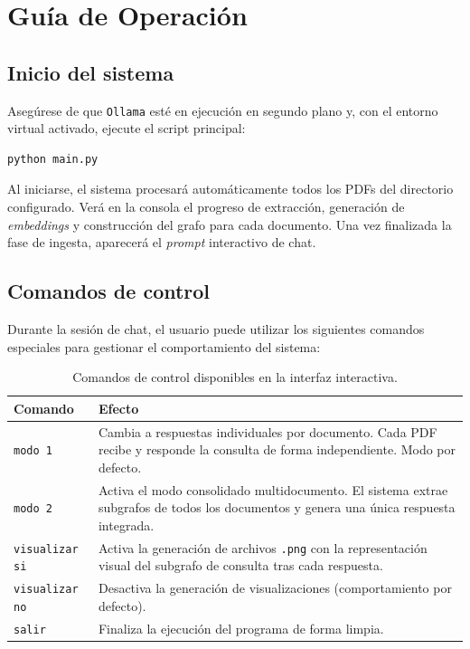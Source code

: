 \section{Guía de Operación}

\subsection{Inicio del sistema}
Asegúrese de que \texttt{Ollama} esté en ejecución en segundo plano y, con el entorno virtual activado, ejecute el script principal:
\begin{verbatim}
python main.py
\end{verbatim}
Al iniciarse, el sistema procesará automáticamente todos los PDFs del directorio configurado. Verá en la consola el progreso de extracción, generación de \textit{embeddings} y construcción del grafo para cada documento. Una vez finalizada la fase de ingesta, aparecerá el \textit{prompt} interactivo de chat.

\subsection{Comandos de control}
Durante la sesión de chat, el usuario puede utilizar los siguientes comandos especiales para gestionar el comportamiento del sistema:

\begin{table}[ht]
\centering
\begin{tabularx}{\textwidth}{|l|X|}
\hline
\textbf{Comando} & \textbf{Efecto} \\ \hline
\texttt{modo 1} & Cambia a respuestas individuales por documento. Cada PDF recibe y responde la consulta de forma independiente. Modo por defecto. \\ \hline
\texttt{modo 2} & Activa el modo consolidado multidocumento. El sistema extrae subgrafos de todos los documentos y genera una única respuesta integrada. \\ \hline
\texttt{visualizar si} & Activa la generación de archivos \texttt{.png} con la representación visual del subgrafo de consulta tras cada respuesta. \\ \hline
\texttt{visualizar no} & Desactiva la generación de visualizaciones (comportamiento por defecto). \\ \hline
\texttt{salir} & Finaliza la ejecución del programa de forma limpia. \\ \hline
\end{tabularx}
\caption{Comandos de control disponibles en la interfaz interactiva.}
\label{tab:comandos}
\end{table}

